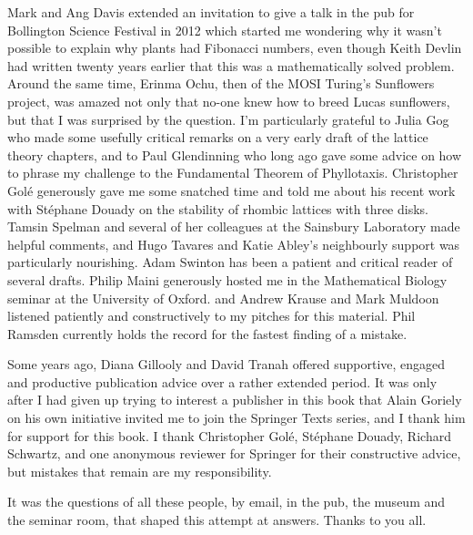 


Mark and Ang Davis extended an invitation to give a talk in the pub for Bollington Science Festival in 2012 which started me wondering why it wasn't possible to explain why plants had Fibonacci numbers, even though Keith Devlin had written twenty years earlier that this was a mathematically solved problem. Around the same time, Erinma Ochu, then of the MOSI Turing's Sunflowers project, was amazed not only that no-one knew how to breed Lucas sunflowers, but that I was surprised by the question.  
I'm particularly grateful to Julia Gog who made some usefully critical remarks on a very early draft of the lattice theory chapters, and to Paul Glendinning who long ago gave some advice on how to phrase my challenge to the Fundamental Theorem of Phyllotaxis.
Christopher Golé generously gave me some snatched time and told me about his recent work with Stéphane Douady on the stability of rhombic lattices with three disks. Tamsin Spelman and several of her colleagues at the Sainsbury Laboratory made helpful comments, and Hugo Tavares and Katie Abley's neighbourly support was particularly nourishing. Adam Swinton has been a patient and critical reader of several drafts.   Philip Maini generously hosted me in the Mathematical Biology seminar at the University of Oxford. and Andrew Krause and Mark Muldoon listened patiently and constructively to my pitches for this material. Phil Ramsden currently holds the record for the fastest finding of a mistake. 

Some years ago,  Diana Gillooly and David Tranah offered supportive, engaged and productive publication advice over a rather extended period. It was only after I had given up trying to interest a publisher in this book that Alain Goriely on his own initiative invited me to join the Springer Texts series, and I thank him for support for this book. I thank Christopher Golé, Stéphane Douady, Richard Schwartz, and one anonymous reviewer for Springer for their constructive advice, but mistakes that remain are my responsibility. 

It was the questions of all these people, by email, in the pub, the museum and the seminar room, that shaped this attempt at answers.  Thanks to you all. 



